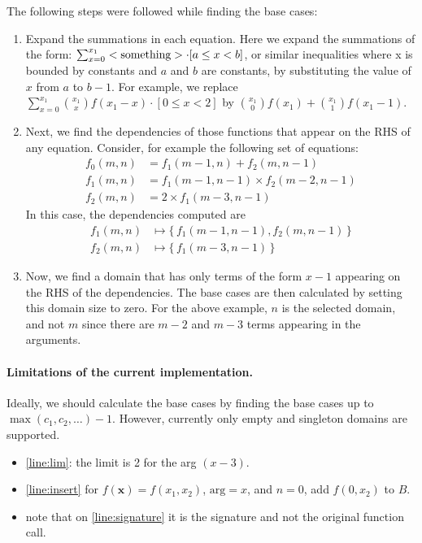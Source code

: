 \documentclass{article}
\begin{document}
The following steps were followed while finding the base cases:
\begin{enumerate}
  \item Expand the summations in each equation. Here we expand the summations of
        the form:
        $\sum_{x=0}^{x_{1}}<\textnormal{something}> \cdot [a \le x < b]$, or
        similar inequalities where x is bounded by constants and $a$ and $b$ are
        constants, by substituting the value of $x$ from $a$ to $b-1$. For
        example, we replace
        $\sum_{x=0}^{x_1} \binom{x_{1}}{x} f(x_1 - x) \cdot [0 \le x < 2]$ by
        $\binom{x_{1}}{0} f(x_1) + \binom{x_{1}}{1} f(x_1-1)$.
  \item Next, we find the dependencies of those functions that appear on the
        RHS of any equation. Consider, for example the following set
        of equations:
        \begin{align*}
          f_{0}(m, n) &= f_{1}(m-1, n) + f_{2}(m, n-1)\\
          f_{1}(m, n) &= f_{1}(m-1, n-1) \times f_{2}(m-2, n-1)\\
          f_{2}(m, n) &= 2 \times f_{1}(m-3, n-1)
        \end{align*}
        In this case, the dependencies computed are
        \begin{align*}
          f_{1}(m, n) &\mapsto \{\, f_{1}(m-1, n-1), f_{2}(m, n-1) \,\}\\
          f_{2}(m, n) &\mapsto \{\, f_{1}(m-3, n-1) \,\}
        \end{align*}
  \item Now, we find a domain that has only terms of the form $x-1$ appearing on
        the RHS of the dependencies. The base cases are then calculated by
        setting this domain size to zero. For the above example, $n$ is the
        selected domain, and not $m$ since there are $m-2$ and $m-3$ terms
        appearing in the arguments.
\end{enumerate}

\paragraph{Limitations of the current implementation.} Ideally, we should
calculate the base cases by finding the base cases up to
$\max(c_{1}, c_{2}, \dots) - 1$. However, currently only empty and singleton
domains are supported.

\begin{itemize}
  \item \cref{line:lim}: the limit is 2 for the arg $(x-3)$.
  \item \cref{line:insert} for $f(\mathbf{x}) = f(x_{1}, x_{2})$,
        $\text{arg} = x$, and $n = 0$, add $f(0, x_{2})$ to $B$.
  \item note that on \cref{line:signature} it is the signature and not the
        original function call.
\end{itemize}
\end{document}
